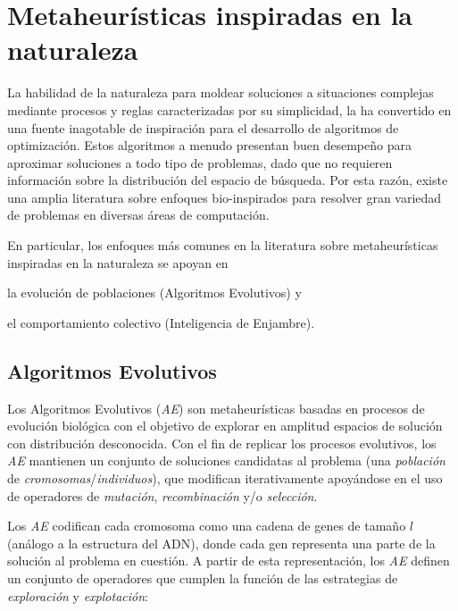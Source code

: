 \section{Metaheurísticas inspiradas en la naturaleza}

La habilidad de la naturaleza para moldear soluciones a situaciones complejas mediante procesos y reglas caracterizadas por su simplicidad, la ha convertido en una fuente inagotable de inspiración para el desarrollo de algoritmos de optimización. Estos algoritmos a menudo presentan buen desempeño para aproximar soluciones a todo tipo de problemas, dado que no requieren información sobre la distribución del espacio de búsqueda. Por esta razón, existe una amplia literatura sobre enfoques bio-inspirados \cite{binitha2012survey} para resolver gran variedad de problemas en diversas áreas de computación.

En particular, los enfoques más comunes en la literatura sobre metaheurísticas inspiradas en la naturaleza se apoyan en
\begin{inparaenum}
\item la evolución de poblaciones (Algoritmos Evolutivos) y
\item el comportamiento colectivo (Inteligencia de Enjambre).
\end{inparaenum}

\subsection{Algoritmos Evolutivos}

Los Algoritmos Evolutivos (\emph{AE}) son metaheurísticas basadas en procesos de evolución biológica con el objetivo de explorar en amplitud espacios de solución con distribución desconocida. Con el fin de replicar los procesos evolutivos, los \emph{AE} mantienen un conjunto de soluciones candidatas al problema (una \emph{población} de \emph{cromosomas}/\emph{individuos}), que modifican iterativamente apoyándose en el uso de operadores de \emph{mutación}, \emph{recombinación} y/o \emph{selección}.

Los \emph{AE} codifican cada cromosoma como una cadena de genes de tamaño $l$ (análogo a la estructura del ADN), donde cada gen representa una parte de la solución al problema en cuestión. A partir de esta representación, los \emph{AE} definen un conjunto de operadores que cumplen la función de las estrategias de \emph{exploración} y \emph{explotación}:

